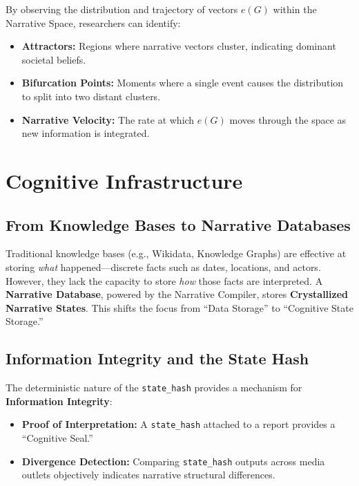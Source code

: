 \documentclass[11pt,a4paper]{article}
\begin{document}
By observing the distribution and trajectory of vectors $e(G)$ within
the Narrative Space, researchers can identify:

\begin{itemize}[noitemsep]
  \item \textbf{Attractors:} Regions where narrative vectors cluster, indicating dominant societal beliefs.
  \item \textbf{Bifurcation Points:} Moments where a single event causes the distribution to split into two distant clusters.
  \item \textbf{Narrative Velocity:} The rate at which $e(G)$ moves through the space as new information is integrated.
\end{itemize}

\section{Cognitive Infrastructure}

\subsection{From Knowledge Bases to Narrative Databases}

Traditional knowledge bases (e.g., Wikidata, Knowledge Graphs) are
effective at storing \emph{what} happened---discrete facts such as
dates, locations, and actors. However, they lack the capacity to store
\emph{how} those facts are interpreted. A \textbf{Narrative Database},
powered by the Narrative Compiler, stores \textbf{Crystallized Narrative
States}. This shifts the focus from ``Data Storage'' to ``Cognitive
State Storage.''

\subsection{Information Integrity and the State Hash}

The deterministic nature of the \texttt{state\_hash} provides a
mechanism for \textbf{Information Integrity}:

\begin{itemize}[noitemsep]
  \item \textbf{Proof of Interpretation:} A \texttt{state\_hash} attached to a report provides a ``Cognitive Seal.''
  \item \textbf{Divergence Detection:} Comparing \texttt{state\_hash} outputs across media outlets objectively indicates narrative structural differences.
\end{itemize}
\end{document}
